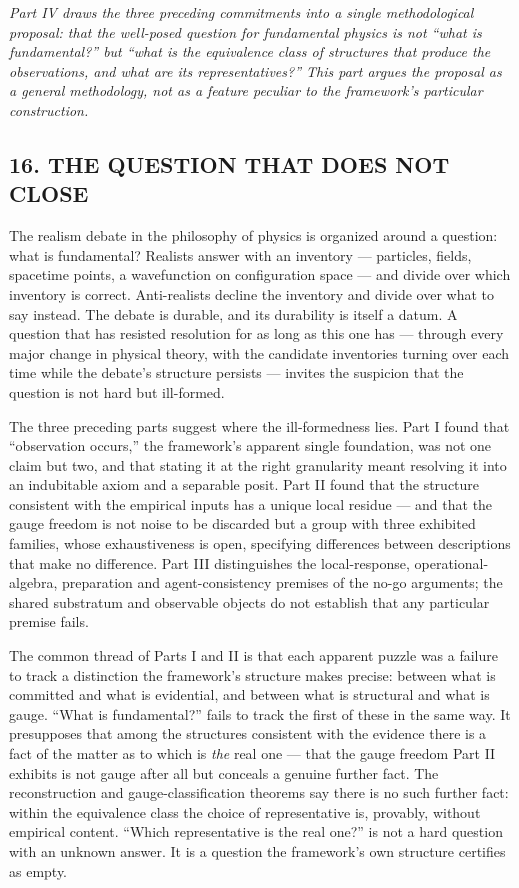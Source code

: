 \documentclass[
]{article}
\begin{document}
\emph{Part IV draws the three preceding commitments into a single
methodological proposal: that the well-posed question for fundamental
physics is not ``what is fundamental?'' but ``what is the equivalence
class of structures that produce the observations, and what are its
representatives?'' This part argues the proposal as a general
methodology, not as a feature peculiar to the framework's particular
construction.}

\hypertarget{the-question-that-does-not-close}{%
\subsection{16. THE QUESTION THAT DOES NOT
CLOSE}\label{the-question-that-does-not-close}}

The realism debate in the philosophy of physics is organized around a
question: what is fundamental? Realists answer with an inventory ---
particles, fields, spacetime points, a wavefunction on configuration
space --- and divide over which inventory is correct. Anti-realists
decline the inventory and divide over what to say instead. The debate is
durable, and its durability is itself a datum. A question that has
resisted resolution for as long as this one has --- through every major
change in physical theory, with the candidate inventories turning over
each time while the debate's structure persists --- invites the
suspicion that the question is not hard but ill-formed.

The three preceding parts suggest where the ill-formedness lies. Part I
found that ``observation occurs,'' the framework's apparent single
foundation, was not one claim but two, and that stating it at the right
granularity meant resolving it into an indubitable axiom and a separable
posit. Part II found that the structure consistent with the empirical
inputs has a unique local residue --- and that the gauge freedom is not
noise to be discarded but a group with three exhibited families, whose
exhaustiveness is open, specifying differences between descriptions that
make no difference. Part III distinguishes the local-response,
operational-algebra, preparation and agent-consistency premises of the
no-go arguments; the shared substratum and observable objects do not
establish that any particular premise fails.

The common thread of Parts I and II is that each apparent puzzle was a
failure to track a distinction the framework's structure makes precise:
between what is committed and what is evidential, and between what is
structural and what is gauge. ``What is fundamental?'' fails to track
the first of these in the same way. It presupposes that among the
structures consistent with the evidence there is a fact of the matter as
to which is \emph{the} real one --- that the gauge freedom Part II
exhibits is not gauge after all but conceals a genuine further fact. The
reconstruction and gauge-classification theorems say there is no such
further fact: within the equivalence class the choice of representative
is, provably, without empirical content. ``Which representative is the
real one?'' is not a hard question with an unknown answer. It is a
question the framework's own structure certifies as empty.
\end{document}
